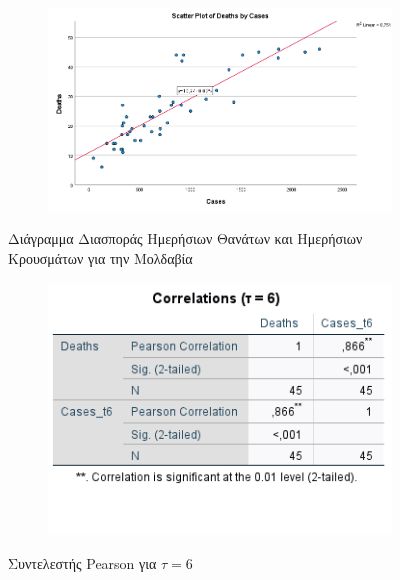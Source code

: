 \documentclass{article}
\begin{document}
\begin{figure}[H]
    \centering
    \begin{adjustbox}{center}
    	\begin{subfigure}[c]{1\textwidth}    
    		\includegraphics[width=1\textwidth,height=\textheight,keepaspectratio]{media/2/scatter_deaths_cases.png}
    	\end{subfigure}%
    \end{adjustbox}
    \caption{Διάγραμμα Διασποράς Ημερήσιων Θανάτων και Ημερήσιων Κρουσμάτων για την Μολδαβία}
    \label{line_deaths_cases}
\end{figure}

\begin{figure}[H]
    \centering
    \begin{adjustbox}{center}
    	\begin{subfigure}[c]{1\textwidth}    
    		\includegraphics[width=1\textwidth,height=\textheight,keepaspectratio]{media/2/pearson_t6.png}
    	\end{subfigure}%
    \end{adjustbox}
    \caption{Συντελεστής \foreignlanguage{english}{Pearson} για $ \tau = 6 $}
    \label{pearson_t6}
\end{figure}
\end{document}
